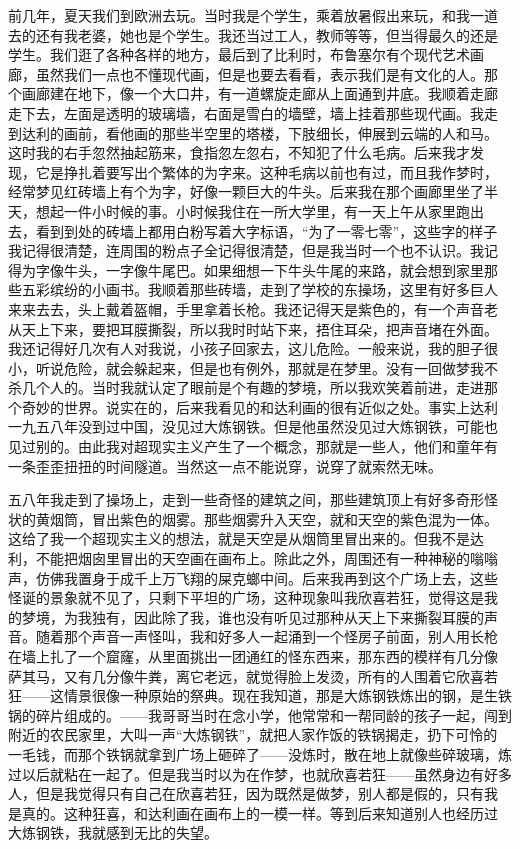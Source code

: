 前几年，夏天我们到欧洲去玩。当时我是个学生，乘着放暑假出来玩，和我一道
去的还有我老婆，她也是个学生。我还当过工人，教师等等，但当得最久的还是
学生。我们逛了各种各样的地方，最后到了比利时，布鲁塞尔有个现代艺术画
廊，虽然我们一点也不懂现代画，但是也要去看看，表示我们是有文化的人。那
个画廊建在地下，像一个大口井，有一道螺旋走廊从上面通到井底。我顺着走廊
走下去，左面是透明的玻璃墙，右面是雪白的墙壁，墙上挂着那些现代画。我走
到达利的画前，看他画的那些半空里的塔楼，下肢细长，伸展到云端的人和马。
这时我的右手忽然抽起筋来，食指忽左忽右，不知犯了什么毛病。后来我才发
现，它是挣扎着要写出个繁体的为字来。这种毛病以前也有过，而且我作梦时，
经常梦见红砖墙上有个为字，好像一颗巨大的牛头。后来我在那个画廊里坐了半
天，想起一件小时候的事。小时候我住在一所大学里，有一天上午从家里跑出
去，看到到处的砖墙上都用白粉写着大字标语，“为了一零七零”，这些字的样子
我记得很清楚，连周围的粉点子全记得很清楚，但是我当时一个也不认识。我记
得为字像牛头，一字像牛尾巴。如果细想一下牛头牛尾的来路，就会想到家里那
些五彩缤纷的小画书。我顺着那些砖墙，走到了学校的东操场，这里有好多巨人
来来去去，头上戴着盔帽，手里拿着长枪。我还记得天是紫色的，有一个声音老
从天上下来，要把耳膜撕裂，所以我时时站下来，捂住耳朵，把声音堵在外面。
我还记得好几次有人对我说，小孩子回家去，这儿危险。一般来说，我的胆子很
小，听说危险，就会躲起来，但是也有例外，那就是在梦里。没有一回做梦我不
杀几个人的。当时我就认定了眼前是个有趣的梦境，所以我欢笑着前进，走进那
个奇妙的世界。说实在的，后来我看见的和达利画的很有近似之处。事实上达利
一九五八年没到过中国，没见过大炼钢铁。但是他虽然没见过大炼钢铁，可能也
见过别的。由此我对超现实主义产生了一个概念，那就是一些人，他们和童年有
一条歪歪扭扭的时间隧道。当然这一点不能说穿，说穿了就索然无味。

五八年我走到了操场上，走到一些奇怪的建筑之间，那些建筑顶上有好多奇形怪
状的黄烟筒，冒出紫色的烟雾。那些烟雾升入天空，就和天空的紫色混为一体。
这给了我一个超现实主义的想法，就是天空是从烟筒里冒出来的。但我不是达
利，不能把烟囱里冒出的天空画在画布上。除此之外，周围还有一种神秘的嗡嗡
声，仿佛我置身于成千上万飞翔的屎克螂中间。后来我再到这个广场上去，这些
怪诞的景象就不见了，只剩下平坦的广场，这种现象叫我欣喜若狂，觉得这是我
的梦境，为我独有，因此除了我，谁也没有听见过那种从天上下来撕裂耳膜的声
音。随着那个声音一声怪叫，我和好多人一起涌到一个怪房子前面，别人用长枪
在墙上扎了一个窟窿，从里面挑出一团通红的怪东西来，那东西的模样有几分像
萨其马，又有几分像牛粪，离它老远，就觉得脸上发烫，所有的人围着它欣喜若
狂——这情景很像一种原始的祭典。现在我知道，那是大炼钢铁炼出的钢，是生铁
锅的碎片组成的。——我哥哥当时在念小学，他常常和一帮同龄的孩子一起，闯到
附近的农民家里，大叫一声“大炼钢铁”，就把人家作饭的铁锅揭走，扔下可怜的
一毛钱，而那个铁锅就拿到广场上砸碎了——没炼时，散在地上就像些碎玻璃，炼
过以后就粘在一起了。但是我当时以为在作梦，也就欣喜若狂——虽然身边有好多
人，但是我觉得只有自己在欣喜若狂，因为既然是做梦，别人都是假的，只有我
是真的。这种狂喜，和达利画在画布上的一模一样。等到后来知道别人也经历过
大炼钢铁，我就感到无比的失望。

